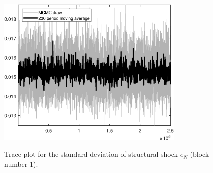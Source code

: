 \begin{figure}[H]
\centering
  \includegraphics[width=0.8\textwidth]{BRS_growth_ext_comovement/graphs/TracePlot_SE_e_N_blck_1}\\
    \caption{Trace plot for the standard deviation of structural shock ${e_N}$ (block number 1).}
\end{figure}
